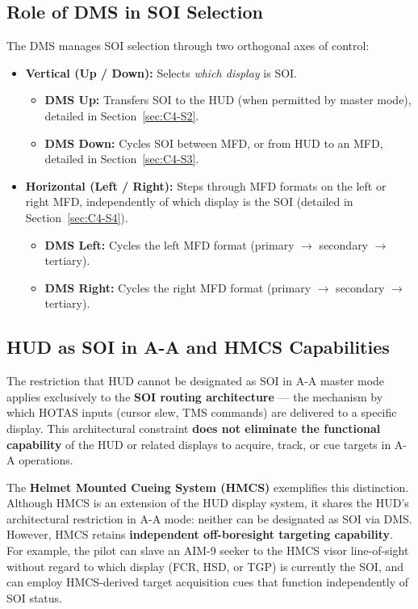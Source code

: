 \documentclass[11pt, a4paper, twoside]{report}
\begin{document}
\subsection{Role of DMS in SOI Selection}
\label{sec:C4-S1-S2}

The DMS manages SOI selection through two orthogonal axes of control:

\begin{itemize}
	\item \textbf{Vertical (Up / Down):} Selects \textit{which display} is SOI.
	\begin{itemize}
		\item \textbf{DMS Up:} Transfers SOI to the HUD (when permitted by master mode), detailed in Section~\ref{sec:C4-S2}.
		\item \textbf{DMS Down:} Cycles SOI between MFD, or from HUD to an MFD, detailed in Section~\ref{sec:C4-S3}.
	\end{itemize}
	\item \textbf{Horizontal (Left / Right):} Steps through MFD formats on the left or right MFD, independently of which display is the SOI (detailed in Section~\ref{sec:C4-S4}).
	\begin{itemize}
		\item \textbf{DMS Left:} Cycles the left MFD format (primary $\to$ secondary $\to$ tertiary).
		\item \textbf{DMS Right:} Cycles the right MFD format (primary $\to$ secondary $\to$ tertiary).
	\end{itemize}
\end{itemize}

\subsection{HUD as SOI in A-A and HMCS Capabilities}
\label{sec:C4-S1-S3}

The restriction that HUD cannot be designated as SOI in A-A master mode applies exclusively to the \textbf{SOI routing architecture} — the mechanism by which HOTAS inputs (cursor slew, TMS commands) are delivered to a specific display. This architectural constraint \textbf{does not eliminate the functional capability} of the HUD or related displays to acquire, track, or cue targets in A-A operations.

The \textbf{Helmet Mounted Cueing System (HMCS)} exemplifies this distinction. Although HMCS is an extension of the HUD display system, it shares the HUD's 
architectural restriction in A-A mode: neither can be designated as SOI via DMS. However, HMCS retains \textbf{independent off-boresight targeting capability}. For example, the pilot can slave an AIM-9 seeker to the HMCS visor line-of-sight without regard to which display (FCR, HSD, or TGP) is currently the SOI, and can employ HMCS-derived target acquisition cues that function independently of SOI status.
\end{document}
